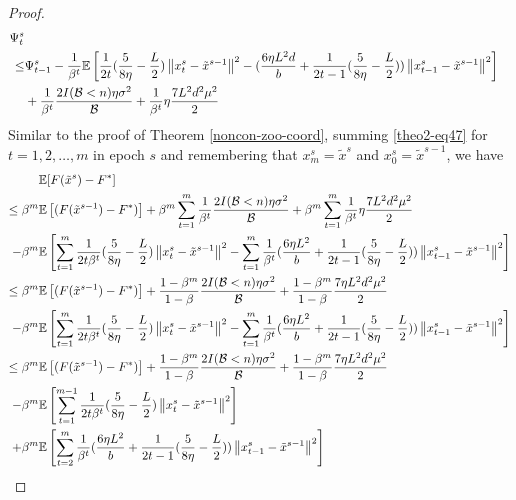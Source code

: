 \documentclass[iicol,sn-basic]{sn-jnl}
\theoremstyle{thmstyleone}%
\theoremstyle{thmstyletwo}%
\theoremstyle{thmstylethree}%
\newcommand*{\E}{\mathbb{E}}
\newcommand{\norm}[1]{\left\lVert#1\right\rVert}
\begin{document}
\begin{proof}
\begin{align} 
\Psi_t^s \notag
\\ \leq& \Psi_{t-1}^s - \frac{1}{\beta^t}\E\left[ \frac{1}{2t}(\frac{5}{8\eta} - \frac{L}{2})\norm{{x}_t^s-\tilde{x}^{s-1}}^2-(\frac{6\eta L^2 d}{b}+\frac{1}{2t-1}(\frac{5}{8\eta} - \frac{L}{2}))\norm{x_{t-1}^s-\tilde{x}^{s-1}}^2\right]\notag\\
&+ \frac{1}{\beta^t}\frac{2I(\mathcal{B} < n)\eta \sigma ^2}{\mathcal{B}}+\frac{1}{\beta^t}\eta \frac{7 L^2 d^2 \mu^2}{2}\label{theo2-eq47}
 \end{align}
Similar to the proof of Theorem \ref{noncon-zoo-coord}, summing \eqref{theo2-eq47} for $t=1, 2, \ldots, m$ in epoch $s$ and remembering that $x_m^s = \tilde{x}^s$ and $x_0^s = \tilde{x}^{s-1}$, we have 
\begin{align}
\E&[F(\tilde{x}^s)-F^*]\notag\\
\leq\beta^m\E&\left[(F(\tilde{x}^{s-1}) - F^*)\right] +\beta^m\sum_{t=1}^m \frac{1}{\beta^t}\frac{2I(\mathcal{B} < n)\eta \sigma ^2}{\mathcal{B}}+\beta^m\sum_{t=1}^m \frac{1}{\beta^t}\eta \frac{7 L^2 d^2 \mu^2}{2}\notag
\\-\beta^m\E&\left[\sum_{t=1}^m\frac{1}{2t\beta^t}(\frac{5}{8\eta} - \frac{L}{2})\norm{{x}_t^s-\tilde{x}^{s-1}}^2-\sum_{t=1}^m\frac{1}{\beta^t}(\frac{6 \eta L^2 }{b}+\frac{1}{2t-1}(\frac{5}{8\eta} - \frac{L}{2})) \norm{x_{t-1}^s-\tilde{x}^{s-1}}^2 \right]\notag\\
\leq\beta^m\E&\left[(F(\tilde{x}^{s-1}) - F^*)\right] + \frac{1-\beta^m}{1-\beta}\frac{2I(\mathcal{B} < n)\eta \sigma ^2}{\mathcal{B}}+\frac{1-\beta^m}{1-\beta} \frac{7 \eta L^2 d^2 \mu^2}{2}\notag
\\-\beta^m\E&\left[\sum_{t=1}^m\frac{1}{2t\beta^t}(\frac{5}{8\eta} - \frac{L}{2})\norm{{x}_t^s-\tilde{x}^{s-1}}^2-\sum_{t=1}^m\frac{1}{\beta^t}(\frac{6\eta L^2 }{b}+\frac{1}{2t-1}(\frac{5}{8\eta} - \frac{L}{2})) \norm{x_{t-1}^s-\tilde{x}^{s-1}}^2 \right]\notag\\
\leq\beta^m\E&\left[(F(\tilde{x}^{s-1}) - F^*)\right] + \frac{1-\beta^m}{1-\beta}\frac{2I(\mathcal{B} < n)\eta \sigma ^2}{\mathcal{B}}+\frac{1-\beta^m}{1-\beta}\frac{7 \eta L^2 d^2 \mu^2}{2}\notag
\\-\beta^m\E&\left[\sum_{t=1}^{m-1}\frac{1}{2t\beta^t}(\frac{5}{8\eta} - \frac{L}{2})\norm{{x}_t^s-\tilde{x}^{s-1}}^2\right]\notag\\
+\beta^m\E&\left[\sum_{t=2}^m\frac{1}{\beta^t}(\frac{6\eta L^2}{b}+\frac{1}{2t-1}(\frac{5}{8\eta} - \frac{L}{2})) \norm{x_{t-1}^s-\tilde{x}^{s-1}}^2 \right]\label{eq48}\\

\end{align}
\end{proof}
\end{document}
